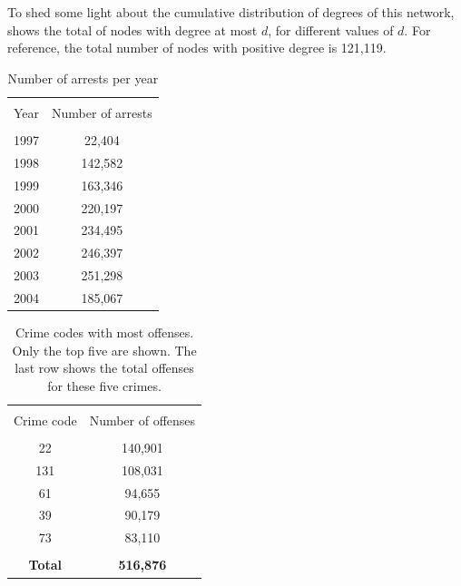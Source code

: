\documentclass[11pt, english]{article}
\begin{document}
\begin{multicols}{2}
To shed some light about the cumulative distribution of degrees of this network,  shows the total of nodes with degree at most $d$, for different values of $d$. For reference, the total number of nodes with positive degree is 121,119.


\begin{table}
	\caption{Number of arrests per year}
	\label{tab:crimes-per-year}
	\centering
	\begin{tabular}{cc}
		\hline\hline
		\\[-1.5ex]
		Year	&	Number of arrests	\\[0.5ex]\hline
		\\[-1.5ex]
		1997	&	\hspace{1ex}22,404	\\[0.2ex]
		1998	&	142,582				\\[0.2ex]
		1999	&	163,346				\\[0.2ex]
		2000	&	220,197				\\[0.2ex]
		2001	&	234,495				\\[0.2ex]
		2002	&	246,397				\\[0.2ex]
		2003	&	251,298				\\[0.2ex]
		2004	&	185,067				\\[0.5ex]
		\hline\hline
	\end{tabular}
	

\end{table}

\begin{table}
	\caption{Crime codes with most offenses. Only the top five are shown. The last row shows the total offenses for these five crimes.}
	\label{tab:notorious-crimes}
	\centering
	\begin{tabular}{cc}
		\hline\hline
		\\[-1.5ex]
		Crime code		&	Number of offenses	\\[0.5ex]\hline
		\\[-1.5ex]
		22				&	140,901	\\[0.2ex]
		131				&	108,031				\\[0.2ex]
		61				&	\hspace{1ex}94,655	\\[0.2ex]
		39				&	\hspace{1ex}90,179	\\[0.2ex]
		73				&	\hspace{1ex}83,110	\\[0.2ex]\hline
		\\[-2ex]
		\textbf{Total}	&	\textbf{516,876}	\\[0.5ex]
		\hline\hline
	\end{tabular}


\end{table}
\end{multicols}
\end{document}
